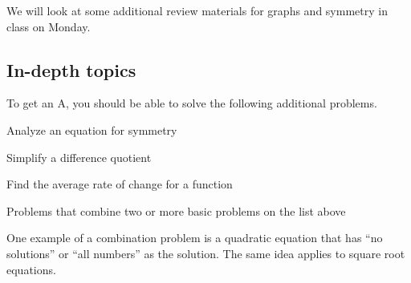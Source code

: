 \documentclass[addpoints, 12pt]{exam}
\begin{document}
We will look at some additional review materials for graphs and symmetry in class on Monday.

\subsection*{In-depth topics}

To get an A, you should be able to solve the following additional problems.
\bigskip

Analyze an equation for symmetry

Simplify a difference quotient

Find the average rate of change for a function

Problems that combine two or more basic problems on the list above
\bigskip

One example of a combination problem is a quadratic equation that has ``no solutions'' or ``all numbers'' as the solution.  The same idea applies to square root equations.
\end{document}
